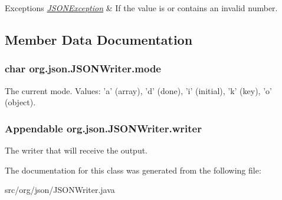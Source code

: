 \begin{DoxyExceptions}{Exceptions}
{\em \hyperlink{classorg_1_1json_1_1JSONException}{J\-S\-O\-N\-Exception}} & If the value is or contains an invalid number. \\
\hline
\end{DoxyExceptions}


\subsection{Member Data Documentation}
\hypertarget{classorg_1_1json_1_1JSONWriter_acabe6b245b148eabfaa3cf975f98073f}{
\subsubsection[{mode}]{\setlength{\rightskip}{0pt plus 5cm}char org.\-json.\-J\-S\-O\-N\-Writer.\-mode\hspace{0.3cm}{\ttfamily [protected]}}}\label{classorg_1_1json_1_1JSONWriter_acabe6b245b148eabfaa3cf975f98073f}
The current mode. Values\-: 'a' (array), 'd' (done), 'i' (initial), 'k' (key), 'o' (object). \hypertarget{classorg_1_1json_1_1JSONWriter_aa90b49b9c27c56b9d9c72186517b83c6}{
\subsubsection[{writer}]{\setlength{\rightskip}{0pt plus 5cm}Appendable org.\-json.\-J\-S\-O\-N\-Writer.\-writer\hspace{0.3cm}{\ttfamily [protected]}}}\label{classorg_1_1json_1_1JSONWriter_aa90b49b9c27c56b9d9c72186517b83c6}
The writer that will receive the output. 

The documentation for this class was generated from the following file\-:\begin{DoxyCompactItemize}
\item 
src/org/json/J\-S\-O\-N\-Writer.\-java\end{DoxyCompactItemize}
